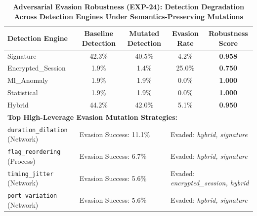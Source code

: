 \begin{table}[t]
\centering
\small
\caption{\textbf{Adversarial Evasion Robustness (EXP-24): Detection Degradation Across Detection Engines Under Semantics-Preserving Mutations}}
\label{tab:evasion_robustness}
\begin{tabular}{lcccc}
\toprule
\textbf{Detection Engine} & \textbf{Baseline Detection} & \textbf{Mutated Detection} & \textbf{Evasion Rate} & \textbf{Robustness Score} \\
\midrule
Signature & 42.3\% & 40.5\% & 4.2\% & \textbf{0.958} \\
Encrypted\_Session & 1.9\% & 1.4\% & 25.0\% & \textbf{0.750} \\
Ml\_Anomaly & 1.9\% & 1.9\% & 0.0\% & \textbf{1.000} \\
Statistical & 1.9\% & 1.9\% & 0.0\% & \textbf{1.000} \\
Hybrid & 44.2\% & 42.0\% & 5.1\% & \textbf{0.950} \\
\midrule
\multicolumn{5}{l}{\textbf{Top High-Leverage Evasion Mutation Strategies:}} \\
\quad \texttt{duration\_dilation} (Network) & \multicolumn{2}{l}{Evasion Success: 11.1\%} & \multicolumn{2}{l}{Evaded: \textit{hybrid, signature}} \\
\quad \texttt{flag\_reordering} (Process) & \multicolumn{2}{l}{Evasion Success: 6.7\%} & \multicolumn{2}{l}{Evaded: \textit{hybrid, signature}} \\
\quad \texttt{timing\_jitter} (Network) & \multicolumn{2}{l}{Evasion Success: 5.6\%} & \multicolumn{2}{l}{Evaded: \textit{encrypted_session, hybrid}} \\
\quad \texttt{port\_variation} (Network) & \multicolumn{2}{l}{Evasion Success: 5.6\%} & \multicolumn{2}{l}{Evaded: \textit{hybrid, signature}} \\
\bottomrule
\end{tabular}
\end{table}
